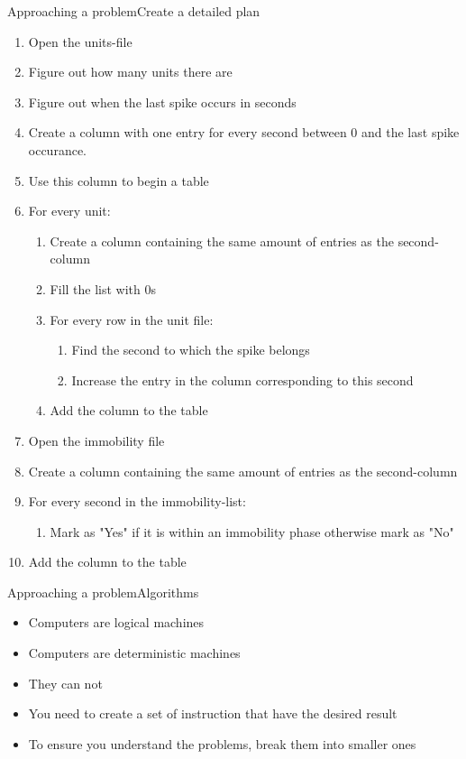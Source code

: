 \documentclass[aspectratio=169]{beamer}
\begin{document}
\begin{frame}{Approaching a problem}{Create a detailed plan}
\tiny
\begin{enumerate}
\item Open the units-file
\item Figure out how many units there are
\item Figure out when the last spike occurs in seconds
\item Create a column with one entry for every second between 0 and the last spike occurance.
\item Use this column to begin a table
\item For every unit:
\begin{enumerate}
\tiny
	\item Create a column containing the same amount of entries as the second-column
	\item Fill the list with 0s
	\item For every row in the unit file:
	\begin{enumerate}
\tiny
		\item Find the second to which the spike belongs
		\item Increase the entry in the column corresponding to this second
	\end{enumerate}
\tiny
	\item Add the column to the table
\end{enumerate}
\tiny
\item Open the immobility file
\item Create a column containing the same amount of entries as the second-column
\item For every second in the immobility-list:
\begin{enumerate}
\tiny
	\item Mark as "Yes" if it is within an immobility phase otherwise mark as "No"
\end{enumerate}
\item Add the column to the table
\end{enumerate}
\end{frame}

\begin{frame}{Approaching a problem}{Algorithms}
\begin{itemize}
	\item Computers are logical machines
	\item Computers are deterministic machines
	\item They can not 
	\item You need to create a set of instruction that have the desired result
	\item To ensure you understand the problems, break them into smaller ones
\end{itemize}
\end{frame}
\end{document}
